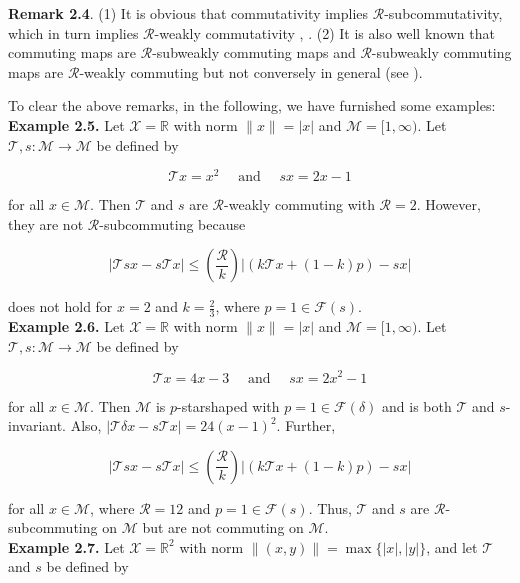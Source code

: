 \documentclass[12pt,a4paper,two side]{article}
\begin{document}
\textbf{Remark 2.4}. (1) It is obvious that commutativity implies $\mathscr{R}$-subcommutativity, which in turn implies $\mathscr{R}$-weakly commutativity \cite{ citation-key13} , \cite{citation-key14}.
(2) It is also well known that commuting maps are $\mathscr{R}$-subweakly commuting maps and $\mathscr{R}$-subweakly commuting maps are $\mathscr{R}$-weakly commuting but not conversely in general (see \cite{citation-key15}).

To clear the above remarks, in the following, we have furnished some examples:\\

\textbf{Example 2.5.} Let $\mathcal{X}=\mathbb{R}$ with norm $\|x\|=|x|$ and $\mathcal{M}=[1, \infty)$. Let $\mathcal{T}, s: \mathcal{M} \rightarrow \mathcal{M}$ be defined by

$$
\mathcal{T} x=x^2 \quad \text { and } \quad s x=2 x-1
$$

for all $x \in \mathcal{M}$. Then $\mathcal{T}$ and $s$ are $\mathcal{R}$-weakly commuting with $\mathcal{R}=2$. However, they are not $\mathscr{R}$-subcommuting because

$$
|\mathcal{T} s x-s \mathcal{T} x| \leq\left(\frac{\mathcal{R}}{k}\right)|(k \mathcal{T} x+(1-k) p)-s x|
$$

does not hold for $x=2$ and $k=\frac{2}{3}$, where $p=1 \in \mathscr{F}(s)$.\\

\textbf{Example 2.6.} Let $\mathcal{X}=\mathbb{R}$ with norm $\|x\|=|x|$ and $\mathcal{M}=[1, \infty)$. Let $\mathcal{T}, s: \mathcal{M} \rightarrow \mathcal{M}$ be defined by

$$
\mathcal{T} x=4 x-3 \quad \text { and } \quad s x=2 x^2-1
$$

for all $x \in \mathcal{M}$. Then $\mathcal{M}$ is $p$-starshaped with $p=1 \in \mathcal{F}(\delta)$ and is both $\mathcal{T}$ and $s$-invariant. Also, $|\mathcal{T} \delta x-s \mathcal{T} x|=24(x-1)^2$. Further,

$$
|\mathcal{T} s x-s \mathcal{T} x| \leq\left(\frac{\mathcal{R}}{k}\right)|(k \mathcal{T} x+(1-k) p)-s x|
$$

for all $x \in \mathcal{M}$, where $\mathcal{R}=12$ and $p=1 \in \mathcal{F}(s)$. Thus, $\mathcal{T}$ and $s$ are $\mathcal{R}$-subcommuting on $\mathcal{M}$ but are not commuting on $\mathcal{M}$.\\

\textbf{Example 2.7.} Let $\mathcal{X}=\mathbb{R}^2$ with norm $\|(x, y)\|=\max \{|x|,|y|\}$, and let $\mathcal{T}$ and $s$ be defined by
\end{document}
